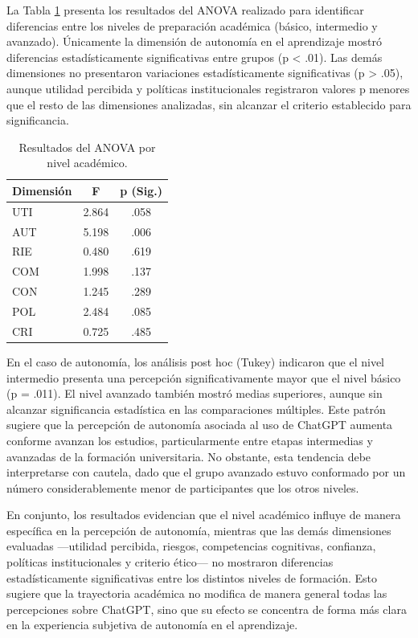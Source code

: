 \documentclass[spanish]{textolivre}
\begin{document}
La Tabla \ref{tab4} presenta los resultados del ANOVA realizado para identificar diferencias entre los niveles de preparación académica (básico, intermedio y avanzado). Únicamente la dimensión de autonomía en el aprendizaje mostró diferencias estadísticamente significativas entre grupos (p < .01). Las demás dimensiones no presentaron variaciones estadísticamente significativas (p > .05), aunque utilidad percibida y políticas institucionales registraron valores p menores que el resto de las dimensiones analizadas, sin alcanzar el criterio establecido para significancia.

\begin{table}[htbp]
\centering
\begin{threeparttable}
\caption{Resultados del ANOVA por nivel académico.}
\label{tab4}
\begin{tabular}{lcc}
\toprule
Dimensión & F & p (Sig.) \\ 
\midrule
UTI & 2.864 & .058 \\
AUT & 5.198 & .006 \\
RIE & 0.480 & .619 \\
COM & 1.998 & .137 \\
CON & 1.245 & .289 \\
POL & 2.484 & .085 \\
CRI & 0.725 & .485 \\
\bottomrule
\end{tabular}
\vspace{6pt}
\end{threeparttable}
\end{table}

En el caso de autonomía, los análisis post hoc (Tukey) indicaron que el nivel intermedio presenta una percepción significativamente mayor que el nivel básico (p = .011). El nivel avanzado también mostró medias superiores, aunque sin alcanzar significancia estadística en las comparaciones múltiples. Este patrón sugiere que la percepción de autonomía asociada al uso de ChatGPT aumenta conforme avanzan los estudios, particularmente entre etapas intermedias y avanzadas de la formación universitaria. No obstante, esta tendencia debe interpretarse con cautela, dado que el grupo avanzado estuvo conformado por un número considerablemente menor de participantes que los otros niveles.

En conjunto, los resultados evidencian que el nivel académico influye de manera específica en la percepción de autonomía, mientras que las demás dimensiones evaluadas —utilidad percibida, riesgos, competencias cognitivas, confianza, políticas institucionales y criterio ético— no mostraron diferencias estadísticamente significativas entre los distintos niveles de formación. Esto sugiere que la trayectoria académica no modifica de manera general todas las percepciones sobre ChatGPT, sino que su efecto se concentra de forma más clara en la experiencia subjetiva de autonomía en el aprendizaje.
\end{document}
